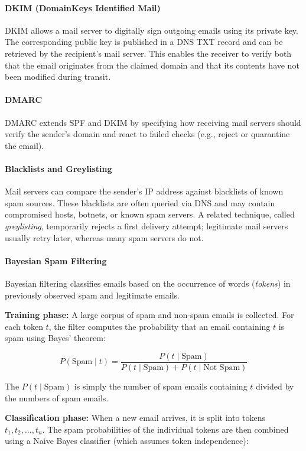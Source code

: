 \paragraph{DKIM (DomainKeys Identified Mail)}
DKIM allows a mail server to digitally sign outgoing emails using its private key. The corresponding public key is published in a DNS TXT record and can be retrieved by the recipient's mail server. This enables the receiver to verify both that the email originates from the claimed domain and that its contents have not been modified during transit.

\paragraph{DMARC}
DMARC extends SPF and DKIM by specifying how receiving mail servers should verify the sender's domain and react to failed checks (e.g., reject or quarantine the email).

\paragraph{Blacklists and Greylisting}
Mail servers can compare the sender's IP address against blacklists of known spam sources. These blacklists are often queried via DNS and may contain compromised hosts, botnets, or known spam servers. A related technique, called \emph{greylisting}, temporarily rejects a first delivery attempt; legitimate mail servers usually retry later, whereas many spam servers do not.

\paragraph{Bayesian Spam Filtering}
Bayesian filtering classifies emails based on the occurrence of words
(\emph{tokens}) in previously observed spam and legitimate emails.

\textbf{Training phase:}
A large corpus of spam and non-spam emails is collected. For each token $t$, the filter computes the probability that an email containing $t$ is spam using Bayes' theorem:

\[
P(\text{Spam}\mid t)
=
\frac{P(t\mid \text{Spam})}
     {P(t\mid \text{Spam}) + P(t\mid \text{Not Spam})}
\]

The $P(t\mid \text{Spam})$ is simply the number of spam emails containing $t$ divided by the numbers of spam emails.

\textbf{Classification phase:}
When a new email arrives, it is split into tokens $t_1,t_2,\ldots,t_n$. The spam probabilities of the individual tokens are then combined using a Naive Bayes classifier (which assumes token independence):

